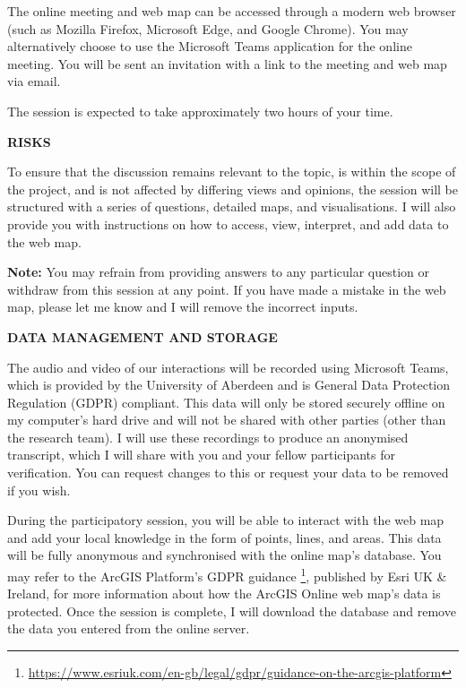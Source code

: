 {The online meeting and web map can be accessed through a modern web browser
(such as Mozilla Firefox, Microsoft Edge, and Google Chrome). You may
alternatively choose to use the Microsoft Teams application for the online
meeting. You will be sent an invitation with a link to the meeting and web map
via email.

The session is expected to take approximately two hours of your time.

\vspace{20pt}
\textbf{\MakeUppercase{Risks}}

To ensure that the discussion remains relevant to the topic, is within the
scope of the project, and is not affected by differing views and opinions, the
session will be structured with a series of questions, detailed maps, and
visualisations. I will also provide you with instructions on how to access,
view, interpret, and add data to the web map.

\textbf{Note:} You may refrain from providing answers to any particular
question or withdraw from this session at any point. If you have made a mistake
in the web map, please let me know and I will remove the incorrect inputs.

\vspace{20pt}
\textbf{\MakeUppercase{Data management and storage}}

The audio and video of our interactions will be recorded using Microsoft Teams,
which is provided by the University of Aberdeen and is General Data Protection
Regulation (GDPR) compliant. This data will only be stored securely offline on
my computer's hard drive and will not be shared with other parties (other than
the research team). I will use these recordings to produce an anonymised
transcript, which I will share with you and your fellow participants for
verification. You can request changes to this or request your data to be
removed if you wish.

During the participatory session, you will be able to interact with the web map
and add your local knowledge in the form of points, lines, and areas. This data
will be fully anonymous and synchronised with the online map's database. You
may refer to the ArcGIS Platform's GDPR guidance%
\footnote{\url{https://www.esriuk.com/en-gb/legal/gdpr/guidance-on-the-arcgis-platform}},
published by Esri UK \& Ireland, for more information about
how the ArcGIS Online web map's data is protected. Once the session is
complete, I will download the database and remove the data you entered from the
online server.

}
